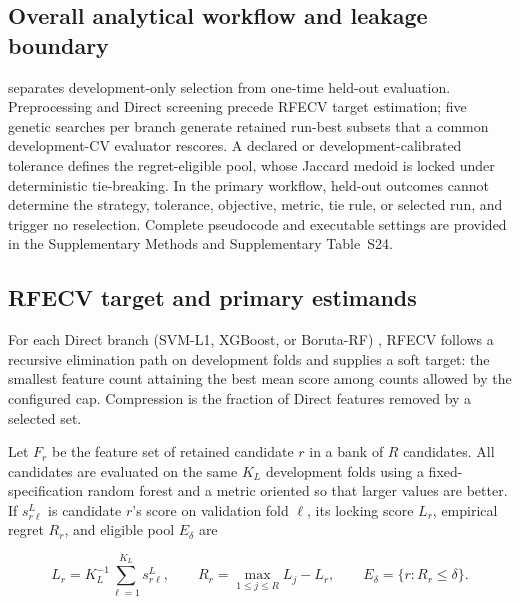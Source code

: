 \subsection{Overall analytical workflow and leakage boundary}

 separates development-only selection from one-time held-out evaluation. Preprocessing and Direct screening precede RFECV target estimation; five genetic searches per branch generate retained run-best subsets that a common development-CV evaluator rescores. A declared or development-calibrated tolerance defines the regret-eligible pool, whose Jaccard medoid is locked under deterministic tie-breaking. In the primary workflow, held-out outcomes cannot determine the strategy, tolerance, objective, metric, tie rule, or selected run, and trigger no reselection. Complete pseudocode and executable settings are provided in the Supplementary Methods and Supplementary Table~S24.

\subsection{RFECV target and primary estimands}

For each Direct branch (SVM-L1, XGBoost, or Boruta-RF) \citep{ref10,ref11,ref13}, RFECV follows a recursive elimination path on development folds and supplies a soft target: the smallest feature count attaining the best mean score among counts allowed by the configured cap. Compression is the fraction of Direct features removed by a selected set.

Let $F_r$ be the feature set of retained candidate $r$ in a bank of $R$ candidates. All candidates are evaluated on the same $K_L$ development folds using a fixed-specification random forest \citep{ref14} and a metric oriented so that larger values are better. If $s^L_{r\ell}$ is candidate $r$'s score on validation fold $\ell$, its locking score $L_r$, empirical regret $R_r$, and eligible pool $E_\delta$ are

\begin{equation}
L_r=K_L^{-1}\sum_{\ell=1}^{K_L}s^{L}_{r\ell},\qquad
R_r=\max_{1\leq j\leq R}L_j-L_r,\qquad
E_\delta=\{r:R_r\leq\delta\}.
\label{eq:regret-eligibility}
\end{equation}

